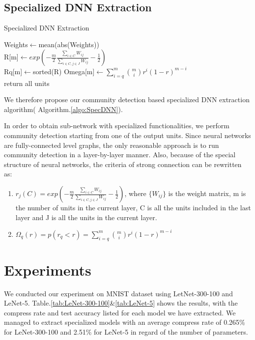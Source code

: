 \documentclass{acmtog} %
\begin{document}
\subsection*{Specialized DNN Extraction}
\begin{algorithm}\label{algo:SpecDNN}
            \caption{Specialized DNN Extraction}
            Weights$\leftarrow$mean(abs(Weights))\\
            R[m]$\leftarrow exp(-\frac{m}{2}\frac{\sum_{i\in C}W_{ij}}{\sum_{i\in C,j\in J}W_{ij}}-\frac{1}{2})$\\
            Rq[m]$\leftarrow$sorted(R)
            Omega[m]$\leftarrow\sum_{i=q}^{m}\binom{m}{i}r^i(1-r)^{m-i}$\\
            return all units
\end{algorithm}
%
We therefore propose our community detection based specialized DNN extraction algorithm( Algorithm.\ref{algo:SpecDNN}).

In order to obtain sub-network with specialized functionalities, we perform community detection starting from one of the output units. Since neural networks are fully-connected level graphs, the only reasonable approach is to run community detection in a layer-by-layer manner. Also, because of the special structure of neural networks, the criteria of strong connection can be rewritten as:
\begin{enumerate}
		\item $r_{j}(C )=exp(-\frac{m}{2}\frac{\sum_{i\in C}W_{ij}}{\sum_{i\in C,j\in J}W_{ij}}-\frac{1}{2})$, where $\{W_{ij}\}$ is the weight matrix, m is the number of units in the current layer, C is all the units included in the last layer and J is all the units in the current layer.
        \item $\Omega_{q}(r )=p(r_{q}<r)=\sum_{i=q}^{m}\binom{m}{i}r^i(1-r)^{m-i}$
\end{enumerate}


\section{Experiments}
\label{sec:experiments}
%
We conducted our experiment on MNIST\cite{MNIST} dataset using LetNet-300-100 and LeNet-5.
Table.\ref{tab:LeNet-300-100}\&\ref{tab:LeNet-5} shows the results, with the compress rate and test accuracy listed for each model we have extracted. We managed to extract specialized models with an average compress rate of 0.265\% for LeNet-300-100 and 2.51\% for LeNet-5 in regard of the number of parameters.
\end{document}
